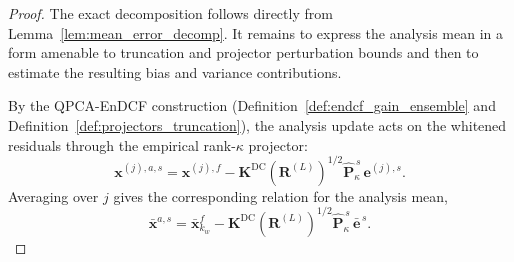 \documentclass[11pt,a4paper]{article}
\begin{document}
\begin{proof}
The exact decomposition follows directly from Lemma~\ref{lem:mean_error_decomp}. It remains to express the analysis mean in a form amenable to truncation and projector perturbation bounds and then to estimate the resulting bias and variance contributions.

\smallskip
\noindent By the QPCA-EnDCF construction (Definition~\ref{def:endcf_gain_ensemble} and Definition~\ref{def:projectors_truncation}), the analysis update acts on the whitened residuals through the empirical rank-$\kappa$ projector:
\begin{equation}
\mathbf{x}^{(j),a,s}
=
\mathbf{x}^{(j),f}
-
\mathbf{K}^{\mathrm{DC}}(\mathbf{R}^{(L)})^{1/2}\hat{\mathbf{P}}_\kappa^{\,s}\,\mathbf{e}^{(j),s}.
\end{equation}
Averaging over $j$ gives the corresponding relation for the analysis mean,
\begin{equation}
\label{eq:mean_update_projector_main}
\bar{\mathbf{x}}^{a,s}
=
\bar{\mathbf{x}}_{k_w}^{f}
-
\mathbf{K}^{\mathrm{DC}}(\mathbf{R}^{(L)})^{1/2}\hat{\mathbf{P}}_\kappa^{\,s}\,\bar{\mathbf{e}}^{\,s}.
\end{equation}


\end{proof}
\end{document}
